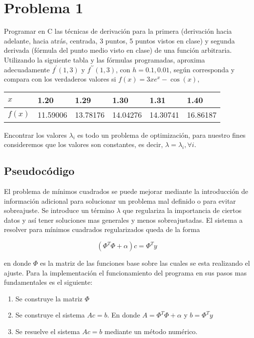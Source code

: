 \documentclass{article}
\begin{document}
\section{Problema 1}
Programar en C las técnicas de derivación para la primera (derivación hacia adelante, hacia atrás, centrada, 3 puntos, 5 puntos vistos en clase) y segunda derivada (fórmula del punto medio visto en clase) de una función arbitraria. Utilizando la siguiente tabla y las fórmulas programadas, aproxima adecuadamente $f^{\prime}(1,3)$ y $f^{\prime \prime}(1,3)$, con $h=0.1,0.01$, según corresponda y compara con los verdaderos valores si $f(x)=3 x e^x-\cos (x)$,
\begin{tabular}{l|l|l|l|l|l}
$x$ & 1.20 & 1.29 & 1.30 & 1.31 & 1.40 \\
\hline$f(x)$ & 11.59006 & 13.78176 & 14.04276 & 14.30741 & 16.86187
\end{tabular}

Encontrar los valores $\lambda_i$ es todo un problema de optimización, para nuestro fines consideremos que los valores son constantes, es decir, $\lambda=\lambda_i, \forall i$.

\subsection{Pseudocódigo}

El problema de mínimos cuadrados se puede mejorar mediante la introducción de información adicional para solucionar un problema mal definido o para evitar sobreajuste. Se introduce un término $\lambda$ que regulariza la importancia de ciertos datos y así tener soluciones mas generales y menos sobreajustadas. 
El sistema a resolver para mínimos cuadrados regularizados queda de la forma

\begin{equation}
    (\Phi^T \Phi + \alpha)c = \Phi^T y
\end{equation}

en donde $\Phi$ es la matriz de las funciones base sobre las cuales se esta realizando el ajuste. 
Para la implementación el funcionamiento del programa en sus pasos mas fundamentales es el siguiente:
\begin{enumerate}
    \item Se construye la matriz $\Phi$
    \item Se construye el sistema $Ac = b$. En donde $A = \Phi^T \Phi + \alpha$ y $b = \Phi^T y$
    \item Se resuelve el sistema $Ac = b$ mediante un método numérico.
\end{enumerate}
\end{document}
